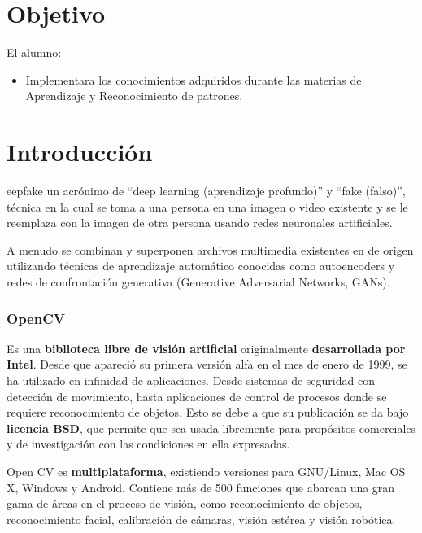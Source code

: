 \documentclass[10pt,journal,compsoc]{IEEEtran}\usepackage[T1]{fontenc}                              %
\begin{document}
%
\IEEEpeerreviewmaketitle

\section{Objetivo}

El alumno:

\begin{itemize}
  \item Implementara los conocimientos adquiridos durante las materias de Aprendizaje y Reconocimiento de patrones.
\end{itemize}



\section{Introducción}
 
 eepfake un acrónimo de ``deep learning (aprendizaje profundo)'' y
``fake (falso)'', técnica en la cual se toma a una persona en una imagen
o video existente y se le reemplaza con la imagen de otra persona usando
redes neuronales artificiales.

A menudo se combinan y superponen archivos multimedia existentes en de
origen utilizando técnicas de aprendizaje automático conocidas como
autoencoders y redes de confrontación generativa (Generative Adversarial
Networks, GANs).

\subsubsection{OpenCV}

Es una \textbf{biblioteca libre de visión artificial} originalmente
\textbf{desarrollada por Intel}. Desde que apareció su primera versión
alfa en el mes de enero de 1999, se ha utilizado en infinidad de
aplicaciones. Desde sistemas de seguridad con detección de movimiento,
hasta aplicaciones de control de procesos donde se requiere
reconocimiento de objetos. Esto se debe a que su publicación se da bajo
\textbf{licencia BSD}, que permite que sea usada libremente para
propósitos comerciales y de investigación con las condiciones en ella
expresadas.

Open CV es \textbf{multiplataforma}, existiendo versiones para
GNU/Linux, Mac OS X, Windows y Android. Contiene más de 500 funciones
que abarcan una gran gama de áreas en el proceso de visión, como
reconocimiento de objetos, reconocimiento facial, calibración de
cámaras, visión estérea y visión robótica.
\end{document}
